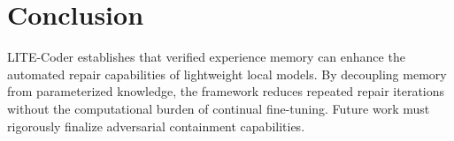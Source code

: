 \section{Conclusion}
LITE-Coder establishes that verified experience memory can enhance the automated repair capabilities of lightweight local models. By decoupling memory from parameterized knowledge, the framework reduces repeated repair iterations without the computational burden of continual fine-tuning. Future work must rigorously finalize adversarial containment capabilities.
